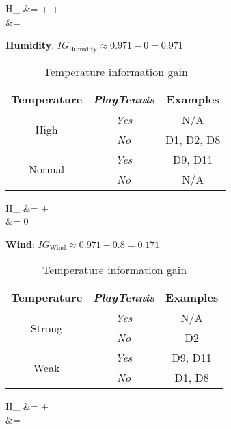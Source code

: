   \begin{aligncustom}
    H_{} &=   +   +   \\
                    &= 
  \end{aligncustom}

\noindent
\textbf{Humidity}: $IG_{\text{Humidity}} \approx 0.971 - 0 = \boxed{0.971} $

  \begin{table}[h]
    \centering
    \caption{Temperature information gain}
    \begin{tabular}{c|c|c}
      \hline
      Temperature  & \textit{PlayTennis} & Examples \\\hline\hline
      \multirow{2}{*}{High}   & \textit{Yes} & N/A \\
                              & \textit{No}  & D1, D2, D8\\\hline
      \multirow{2}{*}{Normal} & \textit{Yes} & D9, D11 \\
                              & \textit{No}  & N/A \\\hline
    \end{tabular}
  \end{table}

  \begin{aligncustom}
    H_{} &=   +   \\
                        &= 0
  \end{aligncustom}

\noindent
\textbf{Wind}: $IG_{\text{Wind}} \approx 0.971 - 0.8 = \boxed{0.171} $

  \begin{table}[h]
    \centering
    \caption{Temperature information gain}
    \begin{tabular}{c|c|c}
      \hline
      Temperature  & \textit{PlayTennis} & Examples \\\hline\hline
      \multirow{2}{*}{Strong} & \textit{Yes} & N/A \\
                              & \textit{No}  & D2 \\\hline
      \multirow{2}{*}{Weak}   & \textit{Yes} & D9, D11 \\
                              & \textit{No}  & D1, D8 \\\hline
    \end{tabular}
  \end{table}

  \begin{aligncustom}
    H_{} &=   +   \\
                        &= 
  \end{aligncustom}

